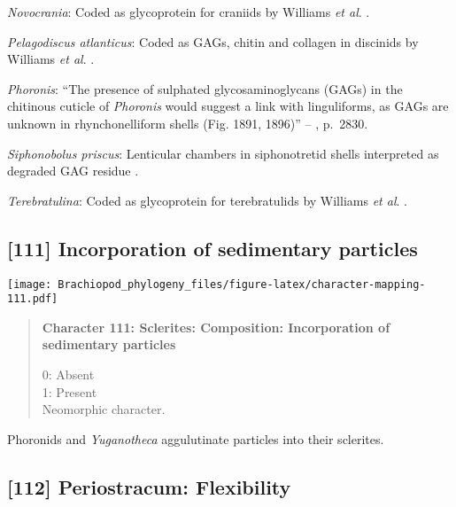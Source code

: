 \documentclass[openany]{book}
\theoremstyle{definition}
\theoremstyle{definition}
\theoremstyle{definition}
\theoremstyle{remark}
\begin{document}
\hypertarget{Novocrania-coding-110}{}
\emph{Novocrania}: Coded as glycoprotein for craniids by Williams
\emph{et al}. \citeyearpar{Williams1996Asupra}.

\hypertarget{Pelagodiscus_atlanticus-coding-110}{}
\emph{Pelagodiscus atlanticus}: Coded as GAGs, chitin and collagen in
discinids by Williams \emph{et al}. \citeyearpar{Williams1996Asupra}.

\hypertarget{Phoronis-coding-110}{}
\emph{Phoronis}: ``The presence of sulphated glycosaminoglycans (GAGs)
in the chitinous cuticle of \emph{Phoronis}
\citep[p.~215]{Herrmann1997Phoronida} would suggest a link with
linguliforms, as GAGs are unknown in rhynchonelliform shells (Fig. 1891,
1896)'' -- \citet{Williams2007Supplement}, p.~2830.

\hypertarget{Siphonobolus_priscus-coding-110}{}
\emph{Siphonobolus priscus}: Lenticular chambers in siphonotretid shells
interpreted as degraded GAG residue
\citep{Williams2004Chemicostructure}.

\hypertarget{Terebratulina-coding-110}{}
\emph{Terebratulina}: Coded as glycoprotein for terebratulids by
Williams \emph{et al}. \citeyearpar{Williams1996Asupra}.

\subsection*{{[}111{]} Incorporation of sedimentary
particles}\label{incorporation-of-sedimentary-particles}

\texttt{[image: Brachiopod\_phylogeny\_files/figure-latex/character-mapping-111.pdf]}

\begin{quote}
\textbf{Character 111: Sclerites: Composition: Incorporation of
sedimentary particles}

0: Absent\\
1: Present\\
Neomorphic character.
\end{quote}

Phoronids and \emph{Yuganotheca} aggulutinate particles into their
sclerites.

\subsection*{{[}112{]} Periostracum:
Flexibility}\label{periostracum-flexibility}
\end{document}
